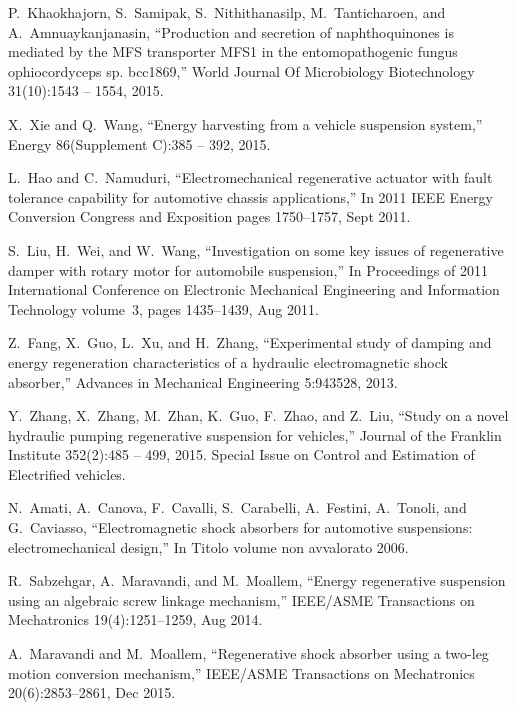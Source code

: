 P.~Khaokhajorn, S.~Samipak, S.~Nithithanasilp, M.~Tanticharoen, and
  A.~Amnuaykanjanasin,
\newblock ``Production and secretion of naphthoquinones is mediated by the MFS transporter MFS1 in the entomopathogenic fungus ophiocordyceps sp. bcc1869,''
\newblock World Journal Of Microbiology Biotechnology 31(10):1543 --
  1554, 2015.

X.~Xie and Q.~Wang,
\newblock ``Energy harvesting from a vehicle suspension system,''
\newblock Energy 86(Supplement C):385 -- 392, 2015.

L.~Hao and C.~Namuduri,
\newblock ``Electromechanical regenerative actuator with fault tolerance
  capability for automotive chassis applications,''
\newblock In 2011 IEEE Energy Conversion Congress and Exposition pages 1750--1757, Sept 2011.

S.~Liu, H.~Wei, and W.~Wang,
\newblock ``Investigation on some key issues of regenerative damper with rotary motor for automobile suspension,''
\newblock In Proceedings of 2011 International Conference on Electronic
  Mechanical Engineering and Information Technology volume~3, pages
  1435--1439, Aug 2011.

Z.~Fang, X.~Guo, L.~Xu, and H.~Zhang,
\newblock ``Experimental study of damping and energy regeneration characteristics of a hydraulic electromagnetic shock absorber,''
\newblock Advances in Mechanical Engineering 5:943528, 2013.

Y.~Zhang, X.~Zhang, M.~Zhan, K.~Guo, F.~Zhao, and Z.~Liu,
\newblock ``Study on a novel hydraulic pumping regenerative suspension for vehicles,''
\newblock Journal of the Franklin Institute 352(2):485 -- 499, 2015.
\newblock Special Issue on Control and Estimation of Electrified vehicles.

N.~Amati, A.~Canova, F.~Cavalli, S.~Carabelli, A.~Festini, A.~Tonoli, and
  G.~Caviasso,
\newblock ``Electromagnetic shock absorbers for automotive suspensions:
  electromechanical design,''
\newblock In Titolo volume non avvalorato 2006.

R.~Sabzehgar, A.~Maravandi, and M.~Moallem,
\newblock ``Energy regenerative suspension using an algebraic screw linkage mechanism,''
\newblock IEEE/ASME Transactions on Mechatronics 19(4):1251--1259, Aug 2014.
  
A.~Maravandi and M.~Moallem,
\newblock ``Regenerative shock absorber using a two-leg motion conversion mechanism,''
\newblock IEEE/ASME Transactions on Mechatronics 20(6):2853--2861, Dec 2015.  

